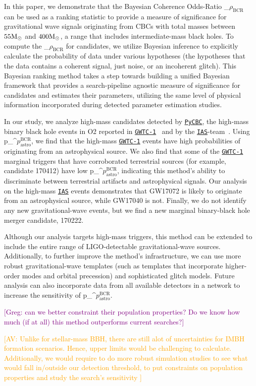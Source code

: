 \documentclass[%
 nofootinbib,
 amsmath,amssymb,
 aps,
 twocolumn,
 superscriptaddress
]{revtex4-2}
\newcommand{\pycbc}{{\sc \href{https://pycbc.org/}{\texttt{PyCBC}}}\xspace}
\newcommand{\GWTC}{{\sc \href{https://ui.adsabs.harvard.edu/abs/2019PhRvX...9c1040A/abstract}{\texttt{GWTC-1}}}\xspace}
\newcommand{\IAS}{{\sc \href{https://ui.adsabs.harvard.edu/abs/2020PhRvD.101h3030V/abstract}{\texttt{IAS}}}\xspace}
\newcommand{\fancytext}[1]{{\relax\ifmmode#1\else $#1$\fi}\xspace}
\newcommand{\mathcmd}[1]{{\sc \relax\ifmmode#1\else $#1$\fi}\xspace}
\newcommand{\bcr}{\mathcmd{\rho_\text{BCR}}}
\newcommand{\msun}{\mathcmd{\text{M}_\odot}}
\newcommand{\pastrobcr}{\fancytext{p_\text{astro}^{\text{BCR}}}}
\newcommand{\avi}[1]{\textcolor{orange}{[AV: #1]}}
\newcommand{\greg}[1]{\textcolor{purple}{[Greg: #1]}}
\begin{document}
In this paper, we demonstrate that the Bayesian Coherence Odds-Ratio \bcr~\cite{BCR1} can be used as a ranking statistic to provide a measure of significance for gravitational wave signals originating from CBCs with total masses between $55\msun$ and $400\msun$, a range that includes intermediate-mass black holes. To compute the \bcr for candidates, we utilize Bayesian inference to explicitly calculate the probability of data under various hypotheses (the hypotheses that the data contains a coherent signal, just noise, or an incoherent glitch). This Bayesian ranking method takes a step towards building a unified Bayesian framework that provides a search-pipeline agnostic measure of significance for candidates and estimates their parameters, utilizing the same level of physical information incorporated during detected parameter estimation studies. 

In our study, we analyze high-mass candidates detected by \pycbc, the high-mass binary black hole events in O2 reported in \GWTC~\cite{GWTC1} and by the \IAS-team~\cite{IAS1, IAS2}. Using \pastrobcr, we find that the high-mass \GWTC events have high probabilities of originating from an astrophysical source. We also find that some of the \GWTC marginal triggers that have corroborated terrestrial sources (for example, candidate 170412) have low \pastrobcr, indicating this method's ability to discriminate between terrestrial artifacts and astrophysical signals. Our analysis on the high-mass \IAS events demonstrates that GW17072 is likely to originate from an astrophysical source, while GW17040 is not. Finally, we do not identify any new gravitational-wave events, but we find a new marginal binary-black hole merger candidate, 170222. 

Although our analysis targets high-mass triggers, this method can be extended to include the entire range of LIGO-detectable gravitational-wave sources. Additionally, to further improve the method's infrastructure, we can use more robust gravitational-wave templates (such as templates that incorporate higher-order modes and orbital precession) and sophisticated glitch models. Future analysis can also incorporate data from all available detectors in a network to increase the sensitivity of \pastrobcr. 

\greg{can we better constraint their population properties? Do we know how much (if at all) this method outperforms current searches?}

\avi{Unlike for stellar-mass BBH, there are still alot of uncertainties for IMBH formation scenarios. Hence, upper limits would be challenging to calculate. Additionally, we would require to do more robust simulation studies to see what would fall in/outside our detection threshold, to put constraints on population properties and study the search's sensitivity
}
\end{document}
